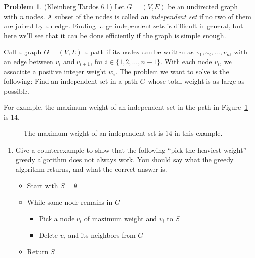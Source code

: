 \documentclass[12pt]{article}
\theoremstyle{definition}
\newtheorem{question}{Problem}
\begin{document}
\newpage
\begin{question}(Kleinberg Tardos 6.1) 
Let $G = (V, E)$ be an undirected graph with $n$ nodes. A subset of the nodes is called an \emph{independent set} if no two of them are joined by an edge. Finding large independent sets is difficult in general; but here we'll see that it can be done efficiently if the graph is simple enough.
	
Call a graph $G =(V, E)$ a path if its nodes can be written as $v_{1}, v_{2}, . . . , v_{n}$, with an edge between $v_{i}$ and $v_{i+1}$, for $i \in \{1, 2, \ldots, n-1\}$. With each node $v_{i}$, we associate a positive integer weight $w_{i}$. The problem we want to solve is the following: Find an independent set in a path $G$ whose total weight is as large as possible.

For example, the maximum weight of an independent set in the path in Figure~\ref{fig:path} is $14$.

\begin{figure}[h]
    \centering
    \caption{The maximum weight of an independent set is $14$ in this example.}\label{fig:path}
  \end{figure}
  
  



\begin{enumerate}[label = (\alph*)]
  \item Give a counterexample to show that the following ``pick the heaviest weight'' greedy algorithm does not always work.  You should say what the greedy algorithm returns,
   and what the correct answer is.

    \begin{itemize}[noitemsep, nolistsep]
      \item Start with $S = \emptyset$
      \item While some node remains in $G$
        \begin{itemize}
          \item Pick a node $v_i$ of maximum weight and $v_i$ to $S$
          \item Delete $v_i$ and its neighbors from $G$
        \end{itemize}
      \item Return $S$
    \end{itemize}







\end{enumerate}
\end{question}
\end{document}
